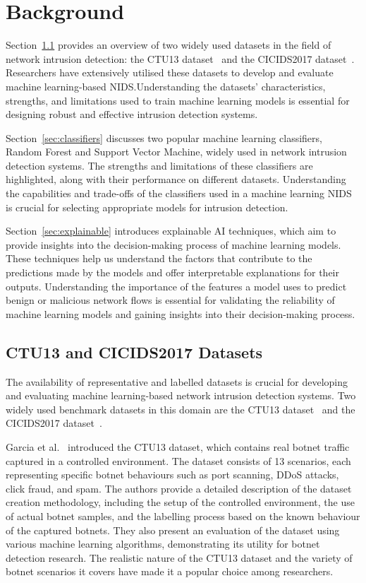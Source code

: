 \chapter{Background}\label{chap:background}

Section~\ref{sec:datasets} provides an overview of two widely used datasets in the field of network intrusion detection: the CTU13 dataset~\cite{garcia2014empirical} and the CICIDS2017 dataset~\cite{sharafaldin2018toward}. Researchers have extensively utilised these datasets to develop and evaluate machine learning-based NIDS.\@ Understanding the datasets' characteristics, strengths, and limitations used to train machine learning models is essential for designing robust and effective intrusion detection systems.

Section~\ref{sec:classifiers} discusses two popular machine learning classifiers, Random Forest and Support Vector Machine, widely used in network intrusion detection systems. The strengths and limitations of these classifiers are highlighted, along with their performance on different datasets. Understanding the capabilities and trade-offs of the classifiers used in a machine learning NIDS is crucial for selecting appropriate models for intrusion detection.

Section~\ref{sec:explainable} introduces explainable AI techniques, which aim to provide insights into the decision-making process of machine learning models. These techniques help us understand the factors that contribute to the predictions made by the models and offer interpretable explanations for their outputs. Understanding the importance of the features a model uses to predict benign or malicious network flows is essential for validating the reliability of machine learning models and gaining insights into their decision-making process.

\section{CTU13 and CICIDS2017 Datasets}\label{sec:datasets}

The availability of representative and labelled datasets is crucial for developing and evaluating machine learning-based network intrusion detection systems. Two widely used benchmark datasets in this domain are the CTU13 dataset~\cite{garcia2014empirical} and the CICIDS2017 dataset~\cite{sharafaldin2018toward}.

Garcia et al.~\cite{garcia2014empirical} introduced the CTU13 dataset, which contains real botnet traffic captured in a controlled environment. The dataset consists of 13 scenarios, each representing specific botnet behaviours such as port scanning, DDoS attacks, click fraud, and spam. The authors provide a detailed description of the dataset creation methodology, including the setup of the controlled environment, the use of actual botnet samples, and the labelling process based on the known behaviour of the captured botnets. They also present an evaluation of the dataset using various machine learning algorithms, demonstrating its utility for botnet detection research. The realistic nature of the CTU13 dataset and the variety of botnet scenarios it covers have made it a popular choice among researchers.


